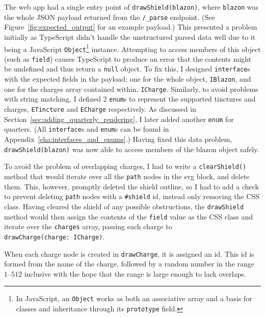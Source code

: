\documentclass[nobib, a4paper, twoside, justified]{tufte-book}
\makeatletter
\newcommand{\svg}{\gls{svg}\@\xspace}
\newcommand{\charge}{\gls{charge}\@\xspace}
\newcommand{\charges}{\glspl{charge}\@\xspace}
\newcommand{\blazon}{\gls{blazon}\@\xspace}
\makeatother
\begin{document}
The web app had a single entry point of \texttt{drawShield(\blazon)}, where \texttt{\blazon} was the
whole JSON payload returned from the \texttt{/\_parse} endpoint. (See
Figure~\ref{fig:expected_output} for an example payload.) This presented a problem initially as
TypeScript didn't handle the unstructured parsed data well due to it being a JavaScript
\texttt{Object}\footnote{In JavaScript, an \texttt{Object} works as both an associative array and a
basis for classes and inheritance through its \texttt{prototype} field.} instance. Attempting to
access members of this object (such as \texttt{\gls{field}}) causes TypeScript to produce an error
that the contents might be undefined and thus return a \texttt{null} object. To fix this, I
designed \texttt{interface}s with the expected fields in the payload; one for the whole object,
\texttt{IBlazon}, and one for the \charges{} array contained within, \texttt{ICharge}. Similarly,
to avoid problems with string matching, I defined 2 \texttt{enum}s to represent the supported
tinctures and \charges{}, \texttt{ETincture} and \texttt{ECharge} respectively. As discussed in
Section~\ref{sec:adding_quarterly_rendering}, I later added another \texttt{enum} for quarters.
(All \texttt{interface}s and \texttt{enum}s can be found in
Appendix~\ref{cha:interfaces_and_enums}.) Having fixed this data problem,
\texttt{drawShield(\blazon)} was now able to access members of the \blazon object safely.

To avoid the problem of overlapping \charges{}, I had to write a \texttt{clearShield()} method that
would iterate over all the \texttt{path} nodes in the \svg{} block, and delete them. This, however,
promptly deleted the shield outline, so I had to add a check to prevent deleting \texttt{path}
nodes with a \texttt{\#shield} id, instead only removing the CSS class. Having cleared the shield
of any possible obstructions, the \texttt{drawShield} method would then assign the contents of the
\texttt{field} value as the CSS class and iterate over the \texttt{\charges{}} array, passing each
\charge{} to \texttt{drawCharge(charge:~ICharge)}.

When each \charge{} node is created in \texttt{drawCharge}, it is assigned an id. This id is formed
from the name of the charge, followed by a random number in the range $1\text{--}512$ inclusive
with the hope that the range is large enough to lack overlaps.
\end{document}
